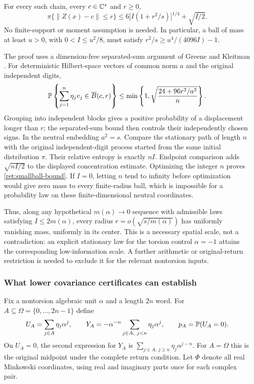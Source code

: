 \begin{proposition}\label{ret:stationary-radius}
For every such chain, every $c\in\mathbb C^s$ and $r\ge0$,
\begin{equation}\label{ret:smallball-bound}
 \pi\{\lVert Z(x)-c\rVert\le r\}
 \le 6\bigl[I(1+r^2/s)\bigr]^{1/4}+\sqrt{I/2}.
\end{equation}
No finite-support or moment assumption is needed.
In particular, a ball of mass at least $u>0$, with $0<I\le u^2/8$, must satisfy $r^2/s\ge u^4/(4096I)-1$.
\end{proposition}

The proof uses a dimension-free separated-sum argument of Greene and Kleitman \cite[Section~9]{GK78}.
For deterministic Hilbert-space vectors of common norm $a$ and the original independent digits,
\[
 \mathbb P\left\{\sum_{j=1}^n\eta_jv_j\in\overline B(c,r)\right\}
 \le\min\left\{1,\sqrt{\frac{24+96r^2/a^2}{n}}\right\}.
\]
Grouping into independent blocks gives a positive probability of a displacement longer than $r$; the separated-sum bound then controls their independently chosen signs.
In the neutral embedding $a^2=s$.
Compare the stationary path of length $n$ with the original independent-digit process started from the same initial distribution $\pi$.
Their relative entropy is exactly $nI$.
Endpoint comparison adds $\sqrt{nI/2}$ to the displayed concentration estimate.
Optimizing the integer $n$ proves \eqref{ret:smallball-bound}.
If $I=0$, letting $n$ tend to infinity before optimization would give zero mass to every finite-radius ball, which is impossible for a probability law on these finite-dimensional neutral coordinates.

Thus, along any hypothetical $m(\alpha)\to0$ sequence with admissible laws satisfying $I\le2m(\alpha)$, every radius $r=o(\sqrt{s/m(\alpha)})$ has uniformly vanishing mass, uniformly in its center.
This is a necessary spatial scale, not a contradiction: an explicit stationary law for the torsion control $\alpha=-1$ attains the corresponding low-information scale.
A further arithmetic or original-return restriction is needed to exclude it for the relevant nontorsion inputs.

\subsubsection{What lower covariance certificates can establish}
\label{ret:blocks}

Fix a nontorsion algebraic unit $\alpha$ and a length $2n$ word.
For $A\subseteq\Omega=\{0,\ldots,2n-1\}$ define
\[
 U_A=\sum_{j\in A}\eta_j\alpha^j,\qquad
 Y_A=-\alpha^{-n}\sum_{j\in A,\ j<n}\eta_j\alpha^j,
 \qquad p_A=\mathbb P(U_A=0).
\]
On $U_A=0$, the second expression for $Y_A$ is $\sum_{j\in A,\ j\ge n}\eta_j\alpha^{j-n}$.
For $A=\Omega$ this is the original midpoint under the complete return condition.
Let $\Phi$ denote all real Minkowski coordinates, using real and imaginary parts once for each complex pair.

